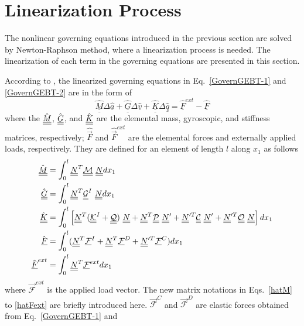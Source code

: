 \section{Linearization Process}
\label{sec:LinearProcess}
The nonlinear governing equations introduced in the previous section are solved by Newton-Raphson method, where a linearization process is needed. The linearization of each term in the governing equations are presented in this section.

According to \cite{Bauchau:2010}, the linearized governing equations in Eq.~\eqref{GovernGEBT-1} and \eqref{GovernGEBT-2} are in the form of
\begin{equation}
	\label{LinearizedEqn}
	\hat{\underline{\underline{M}}} \Delta \hat{\underline{a}} +\hat{\underline{\underline{G}}} \Delta \hat{\underline{v}}+ \hat{\underline{\underline{K}}} \Delta \hat{\underline{q}} = \hat{\underline{F}}^{ext} - \hat{\underline{F}}
\end{equation} 
where the $\hat{\underline{\underline{M}}}$, $\hat{\underline{\underline{G}}}$, and $\hat{\underline{\underline{K}}}$ are the elemental mass, gyroscopic, and stiffness matrices, respectively;
$\hat{\vec{F}}$ and $\hat{\vec{F}}^{ext}$ are the elemental forces and externally applied loads, respectively. 
They are defined for an element of length $l$ along $x_1$ as follows
\begin{align}
	\label{hatM} 
	\hat{\underline{\underline{M}}}&= \int_0^l \underline{\underline{N}}^T \mathcal{\underline{\underline{M}}} ~\underline{\underline{N}} dx_1 \\
	\label{hatG}
	\hat{\underline{\underline{G}}} &= \int_0^l \underline{\underline{N}}^T \underline{\underline{\mathcal{G}}}^I~\underline{\underline{N}} dx_1\\ 
	\label{hatK}
	\hat{\underline{\underline{K}}}&=\int_0^l \left[ \underline{\underline{N}}^T (\underline{\underline{\mathcal{K}}}^I + \mathcal{\underline{\underline{Q}}})~ \underline{\underline{N}} + \underline{\underline{N}}^T \mathcal{\underline{\underline{P}}}~ \underline{\underline{N}}^\prime + \underline{\underline{N}}^{\prime T} \mathcal{\underline{\underline{C}}}~ \underline{\underline{N}}^\prime + \underline{\underline{N}}^{\prime T} \mathcal{\underline{\underline{O}}}~ \underline{\underline{N}} \right] d x_1 \\	
	\label{hatF}
	\hat{\underline{F}} &= \int_0^l (\underline{\underline{N}}^T \underline{\mathcal{F}}^I + \underline{\underline{N}}^T \mathcal{\underline{F}}^D + \underline{\underline{N}}^{\prime T} \mathcal{\underline{F}}^C)dx_1 \\
	\label{hatFext}
	\hat{\underline{F}}^{ext}& = \int_0^l \underline{\underline{N}}^T \mathcal{\underline{F}}^{ext} dx_1 
\end{align}
where $\mathcal{\vec{F}}^{ext}$ is the applied load vector. The new matrix notations in Eqs.~\eqref{hatM} to \eqref{hatFext} are briefly
introduced here. 
$\mathcal{\vec{F}}^C$ and $\mathcal{\vec{F}}^D$ are elastic forces obtained from Eq.~\eqref{GovernGEBT-1} and
